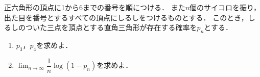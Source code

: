 \documentclass[../../main.tex]{subfiles}
\begin{document}
正六角形の頂点に1から6までの番号を順につける．
また$n$個のサイコロを振り，
出た目を番号とするすべての頂点にしるしをつけるものとする．
このとき，しるしのついた三点を頂点とする直角三角形が存在する確率を$p_n$とする．
\begin{enumerate}
  \item $p_3$，$p_4$を求めよ．
  \item $\displaystyle\lim_{n\to\infty}\dfrac{1}{n}\log(1-p_n)$を求めよ．
\end{enumerate}
\end{document}
